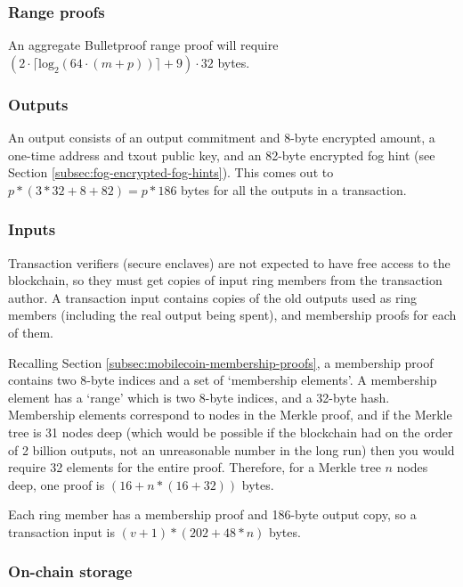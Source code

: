 \subsubsection*{Range proofs}

An aggregate Bulletproof range proof will require $(2 \cdot \lceil \textrm{log}_2(64 \cdot (m+ p)) \rceil + 9) \cdot 32$ bytes.

\subsubsection*{Outputs}

An output consists of an output commitment and 8-byte encrypted amount, a one-time address and txout public key, and an 82-byte encrypted fog hint (see Section \ref{subsec:fog-encrypted-fog-hints}). This comes out to $p*(3*32 + 8 + 82) = p*186$ bytes for all the outputs in a transaction.

\subsubsection*{Inputs}

Transaction verifiers (secure enclaves) are not expected to have free access to the blockchain, so they must get copies of input ring members from the transaction author. A transaction input contains copies of the old outputs used as ring members (including the real output being spent), and membership proofs for each of them.

Recalling Section \ref{subsec:mobilecoin-membership-proofs}, a membership proof contains two 8-byte indices and a set of `membership elements'. A membership element has a `range' which is two 8-byte indices, and a 32-byte hash. Membership elements correspond to nodes in the Merkle proof, and if the Merkle tree is 31 nodes deep (which would be possible if the blockchain had on the order of 2 billion outputs, not an unreasonable number in the long run) then you would require 32 elements for the entire proof. Therefore, for a Merkle tree $n$ nodes deep, one proof is $(16 + n*(16 + 32))$ bytes.%

Each ring member has a membership proof and 186-byte output copy, so a transaction input is $(v + 1)*(202 + 48*n)$ bytes.

\subsubsection*{On-chain storage}

